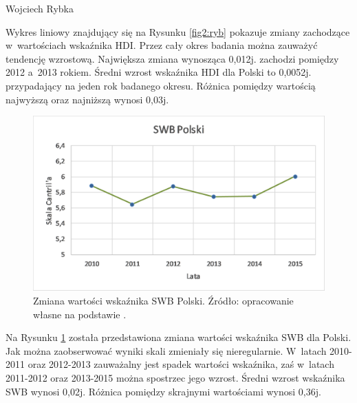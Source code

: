 \begin{artplenv}{Wojciech Rybka}
%
%

Wykres liniowy znajdujący się na Rysunku \ref{fig2:ryb} pokazuje zmiany zachodzące w~wartościach wskaźnika HDI. Przez cały okres
badania można zauważyć tendencję wzrostową. Największa zmiana wynosząca 0,012j. zachodzi pomiędzy 2012 a~2013 rokiem.
Średni wzrost wskaźnika HDI dla Polski to 0,0052j. przypadający na jeden rok badanego okresu. Różnica pomiędzy
wartością najwyższą oraz najniższą wynosi 0,03j.

\begin{figure}[H]
	\centering
	\includegraphics[width=1\textwidth]{ART_Rybka/swb_polski.png} 
	\caption{Zmiana wartości wskaźnika SWB Polski.
		Źródło: opracowanie własne na podstawie
		\parencite{noauthor_world_2018}.
	}
	\label{fig3:ryb}
\end{figure}


%
%

Na Rysunku \ref{fig3:ryb} została przedstawiona zmiana wartości wskaźnika SWB dla Polski. Jak można zaobserwować wyniki skali
zmieniały się nieregularnie. W~latach 2010-2011 oraz 2012-2013 zauważalny jest spadek wartości wskaźnika, zaś w~latach
2011-2012 oraz 2013-2015 można spostrzec jego wzrost. Średni wzrost wskaźnika SWB wynosi 0,02j. Różnica pomiędzy
skrajnymi wartościami wynosi 0,36j.


\end{artplenv}

